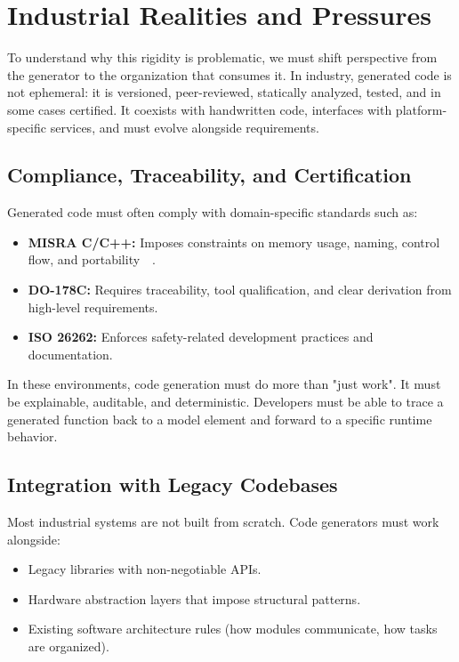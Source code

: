 \section{Industrial Realities and Pressures}
\label{sec:industrial_realities}

To understand why this rigidity is problematic, we must shift perspective from the generator to the organization that consumes it. In industry, generated code is not ephemeral: it is versioned, peer-reviewed, statically analyzed, tested, and in some cases certified. It coexists with handwritten code, interfaces with platform-specific services, and must evolve alongside requirements.

\subsection*{Compliance, Traceability, and Certification}

Generated code must often comply with domain-specific standards such as:

\begin{itemize}
	\item \textbf{\gls{MISRA} C/C++:} Imposes constraints on memory usage, naming, control flow, and portability~\cite{Misra_C_2025}~\cite{Misra_Cpp_2023}.
	\item \textbf{DO-178C:} Requires traceability, tool qualification, and clear derivation from high-level requirements. 
	\item \textbf{ISO 26262:} Enforces safety-related development practices and documentation.
\end{itemize}

In these environments, code generation must do more than "just work". It must be explainable, auditable, and deterministic. Developers must be able to trace a generated function back to a model element and forward to a specific runtime behavior.

\subsection*{Integration with Legacy Codebases}

Most industrial systems are not built from scratch. Code generators must work alongside:

\begin{itemize}
	\item Legacy libraries with non-negotiable \gls{API}s.
	\item Hardware abstraction layers that impose structural patterns.
	\item Existing software architecture rules (how modules communicate, how tasks are organized).
\end{itemize}

